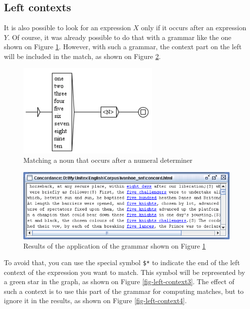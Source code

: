 \subsection{Left contexts}
\index{\verbc{$*}}
It is also possible to look for an expression $X$ only if it
occurs after an expression $Y$. Of course, it was already possible to do that with a grammar
like the one shown on Figure \ref{fig-left-context1}. However, with such a
grammar, the context part on the left will be included in the match, as shown on Figure
\ref{fig-left-context2}.

\begin{figure}[!ht]
\begin{center}
\includegraphics[width=7cm]{resources/img/fig6-17a.png}
\caption{Matching a noun that occurs after a numeral
determiner\label{fig-left-context1}}
\end{center}
\end{figure}

\begin{figure}[!ht]
\begin{center}
\includegraphics[width=14cm]{resources/img/fig6-17b.png}
\caption{Results of the application of the grammar shown on Figure
\ref{fig-left-context1}\label{fig-left-context2}}
\end{center}
\end{figure}

\bigskip
\noindent To avoid that, you can use the special symbol \verb+$*+ to indicate
the end of the left context of the expression you want to match. This symbol
will be represented by a green star in the graph, as shown on Figure
\ref{fig-left-context3}. The effect of such a context is to use this part of the
grammar for computing matches, but to ignore it in the results, as shown on
Figure \ref{fig-left-context4}.

